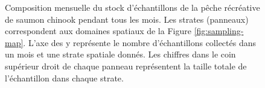 \begin{figure}[htb]
    \centering
    \caption{Composition mensuelle du stock d'échantillons de la pêche récréative de saumon chinook pendant tous les mois. Les strates (panneaux) correspondent aux domaines spatiaux de la Figure \ref{fig:sampling-map}. L'axe des y représente le nombre d'échantillons collectés dans un mois et une strate spatiale donnés. Les chiffres dans le coin supérieur droit de chaque panneau représentent la taille totale de l'échantillon dans chaque strate.}
    \label{fig:bar-rec-full}
\end{figure}


